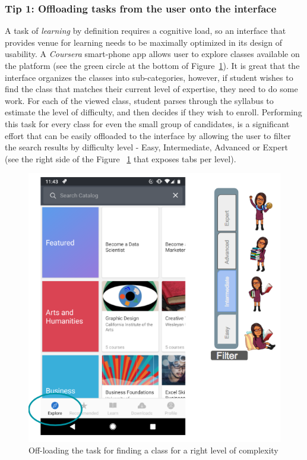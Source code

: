 \documentclass[12pt,letterpaper]{article}
\begin{document}
\subsubsection*{Tip 1: Offloading tasks from the user onto the interface}
A task of \textit{learning} by definition requires a cognitive load, so an interface that provides venue for learning needs to be maximally optimized in its design of usability. A \textit{Coursera} smart-phone app allows user to explore classes available on the platform (see the green circle at the bottom of Figure~\ref{fig::5}). It is great that the interface organizes the classes into sub-categories, however, if student wishes to find the class that matches their current level of expertise, they need to do some work. For each of the viewed class, student parses through the syllabus to estimate the level of difficulty, and then decides if they wish to enroll. Performing this task for every class for even the small group of candidates, is a significant effort that can be easily offloaded to the interface by allowing the user to filter the search results by difficulty level - Easy, Intermediate, Advanced or Expert (see the right side of the Figure ~\ref{fig::5} that exposes tabs per level).  

\begin{figure}[h]
\centering
\includegraphics[scale=.4]{figures/p2/coursera_filter.png}
\caption{Off-loading the task for finding a class for a right level of complexity}
\label{fig::5}
\end{figure}

 

\end{document}

